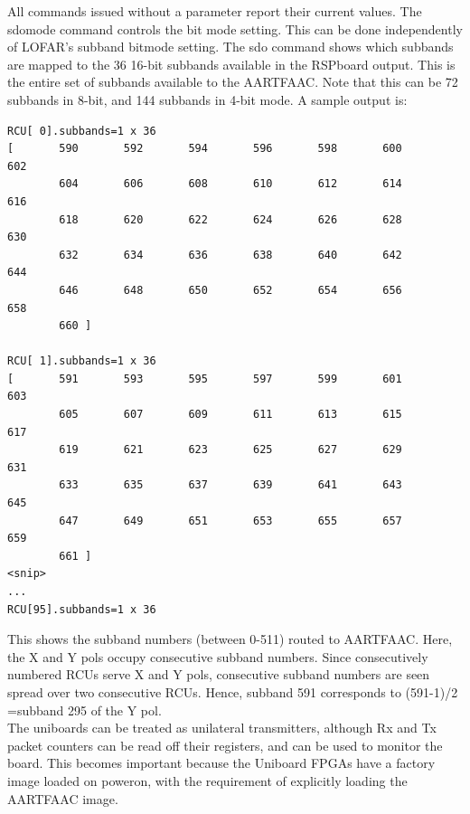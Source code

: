 \documentclass {article}
\begin{document}
All  commands issued  without a  parameter report  their current  values.  The
sdomode command controls the bit mode  setting. This can be done independently
of LOFAR's  subband bitmode  setting. The  sdo command  shows which
subbands  are mapped  to  the 36  16-bit subbands  available  in the  RSPboard
output. This  is the entire  set of subbands  available to the  AARTFAAC. Note
that this  can be 72  subbands in  8-bit, and 144  subbands in 4-bit  mode.  A
sample output is:
\begin{verbatim}
RCU[ 0].subbands=1 x 36
[       590       592       594       596       598       600       602 
        604       606       608       610       612       614       616 
        618       620       622       624       626       628       630 
        632       634       636       638       640       642       644 
        646       648       650       652       654       656       658 
        660 ]

RCU[ 1].subbands=1 x 36
[       591       593       595       597       599       601       603 
        605       607       609       611       613       615       617 
        619       621       623       625       627       629       631 
        633       635       637       639       641       643       645 
        647       649       651       653       655       657       659 
        661 ]
<snip>
...
RCU[95].subbands=1 x 36
\end{verbatim}
This shows the subband numbers (between 0-511) routed to AARTFAAC. Here, the X and Y
pols  occupy consecutive  subband numbers.  Since consecutively  numbered RCUs
serve  X and  Y pols,  consecutive subband  numbers are  seen spread  over two
consecutive RCUs. Hence, subband 591 corresponds to (591-1)/2 =subband 295 of
the Y pol.\\

The  uniboards can be treated as unilateral transmitters, although Rx and Tx packet counters can be read off their registers, and can be used to monitor the board. This becomes important because the Uniboard FPGAs have a factory image loaded on poweron, with the requirement of explicitly loading the AARTFAAC image.
\end{document}
